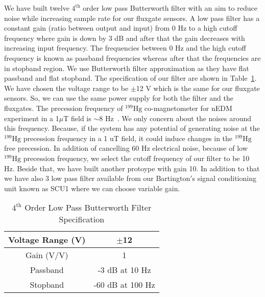 We have built twelve $\mathrm{4^{th}}$ order low pass Butterworth filter with an aim to reduce noise while increasing sample rate for our fluxgate sensors. A low pass filter has a constant gain (ratio between output and input) from 0 Hz to a high cutoff frequency where gain is down by 3 dB and after that the gain decreases with increasing input frequency. The frequencies between 0 Hz and the high cutoff frequency is known as passband frequencies whereas after that the frequencies are in stopband region. We use Butterworth filter approximation as they have flat passband and flat stopband. The specification of our filter are shown in Table~\ref{table:butter}. We have chosen the voltage range to be $\pm$12 V which is the same for our fluxgate sensors. So, we can use the same power supply for both the filter and the fluxgates. The precession frequency of $\mathrm{^{199}Hg}$ co-magnetometer for nEDM experiment in a 1$\mu$T field is $\sim$8 Hz~\cite{bea}. We only concern about the noises around this frequency. Because, if the system has any potential of generating noise at the $\mathrm{^{199}Hg}$ precession frequency in a 1 uT field, it could induce changes in the $\mathrm{^{199}Hg}$ free precession. In addition of cancelling 60 Hz electrical noise, because of low $\mathrm{^{199}Hg}$ precession frequency, we select the cutoff frequency of our filter to be 10 Hz. Beside that, we have built another protoype with gain 10. In addition to that we have also 3 low pass filter available from our Bartington$'$s signal conditioning unit known as SCU1 where we can choose variable gain.


\begin{table} [!htb]
    \centering
    \begin{tabular} { |c|c| } 
        \hline
        Voltage Range (V) & $\pm$12\\ 
        \hline
        Gain (V/V) & 1 \\ 
        \hline
        Passband & -3 dB at 10 Hz\\ 
        \hline
        Stopband & -60 dB at 100 Hz\\
         \hline
    \end{tabular}
    \caption{$\mathrm{4^{th}}$ Order Low Pass Butterworth Filter Specification}\label{table:butter}
\end{table}

